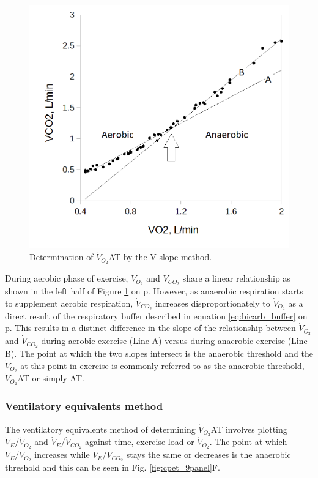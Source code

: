 \begin{figure}[htbp]
	\centering
	\includegraphics[width=\textwidth]{Figures/cpet_vslope}
	\caption{Determination of $\dot{V}_{O_2}$AT by the V-slope method.}
	\label{fig:cpet_vslope}
\end{figure}

During aerobic phase of exercise, $\dot{V}_{O_2}$ and $\dot{V}_{CO_2}$ share a linear relationship as shown in the left half of Figure \ref{fig:cpet_vslope} on p\pageref{fig:cpet_vslope}. However, as anaerobic respiration starts to supplement aerobic respiration, $\dot{V}_{CO_2}$ increases disproportionately to $\dot{V}_{O_2}$ as a direct result of the respiratory buffer described in equation \ref{eq:bicarb_buffer} on p\pageref{eq:bicarb_buffer}. This results in a distinct difference in the slope of the relationship between $\dot{V}_{O_2}$ and $\dot{V}_{CO_2}$ during aerobic exercise (Line A) versus during anaerobic exercise (Line B). The point at which the two slopes intersect is the anaerobic threshold and the $\dot{V}_{O_2}$ at this point in exercise is commonly referred to as the anaerobic threshold, $\dot{V}_{O_2}$AT or simply AT. 

\subsubsection{Ventilatory equivalents method}
The ventilatory equivalents method of determining $\dot{V}_{O_2}$AT involves plotting $\dot{V}_E/\dot{V}_{O_2}$
and $\dot{V}_E/\dot{V}_{CO_2}$ against time, exercise load or $\dot{V}_{O_2}$. The point at which $\dot{V}_E/\dot{V}_{O_2}$ increases while $\dot{V}_E/\dot{V}_{CO_2}$ stays the same or decreases is the anaerobic threshold and this can be seen in Fig. \ref{fig:cpet_9panel}F.




